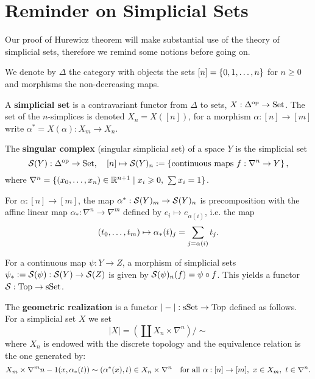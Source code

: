 \section{Reminder on Simplicial Sets}\label{section:reminder-on-sset}

Our proof of Hurewicz theorem will make substantial use of the theory of simplicial sets, therefore we remind some notions before going on.

We denote by $\Delta$ the category with objects the sets $[n]=\cb{0,1,\dots,n}$ for $n\geq 0$ and morphisms the non-decreasing maps.

A \textbf{simplicial set} is a contravariant functor from $\Delta$ to sets, $X:\Delta^\op \to\Set$. The set of the $n$-simplices is denoted $X_n=X([n])$, for a morphism $\alpha:[n]\to[m]$ write $\alpha^*=X(\alpha):X_m\to X_n$.

The \textbf{singular complex} (singular simplicial set) of a space $Y$ is the simplicial set
\[\S(Y):\Delta^\op \to\Set, \quad [n] \mapsto \S(Y)_n :=\left\{\text{continuous maps }f:\nabla^n \to Y\right\},\]
where $\nabla^n=\{(\xso)\in\R^{n+1}\mid x_i\geq0,\ \sum x_i=1\}$.

For $\alpha: [n]\to [m]$, the map $\alpha^*:\S(Y)_m\to\S(Y)_n$ is precomposition with the affine linear map $\alpha_*:\nabla^n\to\nabla^m$ defined by $e_i\mapsto e_{\alpha(i)}$, i.e. the map
\[(\nno{t}{m})\mapsto\alpha_*(t)_j=\sum_{j=\alpha(i)}t_j.\]

For a continuous map $\psi:Y\to Z$, a morphism of simplicial sets $\psi_*:=\S(\psi):\S(Y)\to\S(Z)$ is given by $\S(\psi)_n(f)=\psi\circ f$. This yields a functor $\S:\Top\to\sSet$.

The \textbf{geometric realization} is a functor $|-|:\sSet\to\Top$ defined as follows. For a simplicial set $X$ we set
\[|X|=\left(\coprod X_n\times\nabla^n\right)/\sim\]
where $X_n$ is endowed with the discrete topology and the equivalence relation is the one generated by:\normalmarginpar{}
\[X_m\times\nabla^m\cont(x,\alpha_*(t))\sim(\alpha^*(x),t)\in X_n\times\nabla^n\quad\text{for all }\alpha:[n]\to[m],\ x\in X_m,\ t\in\nabla^n.\]

\reversemarginpar
